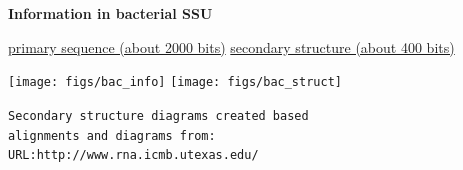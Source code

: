 \documentclass[landscape]{slides}
\begin{document}
\begin{slide}
\begin{center}
\large
\textbf{Information in bacterial SSU}
\end{center}
\small
\hspace{1.0in}
\underline{primary sequence (about 2000 bits)}
\hspace{0.7in}
\underline{secondary structure (about 400 bits)}

\begin{center}
\texttt{[image: figs/bac\_info]}
\texttt{[image: figs/bac\_struct]}
\end{center}

\begin{flushright}
\tiny{\texttt{Secondary structure diagrams created based}} \\
\tiny{\texttt{alignments and diagrams from:}} \\
\tiny{\texttt{URL:http://www.rna.icmb.utexas.edu/}}
\end{flushright}
\vfill
\end{slide}
\end{document}
